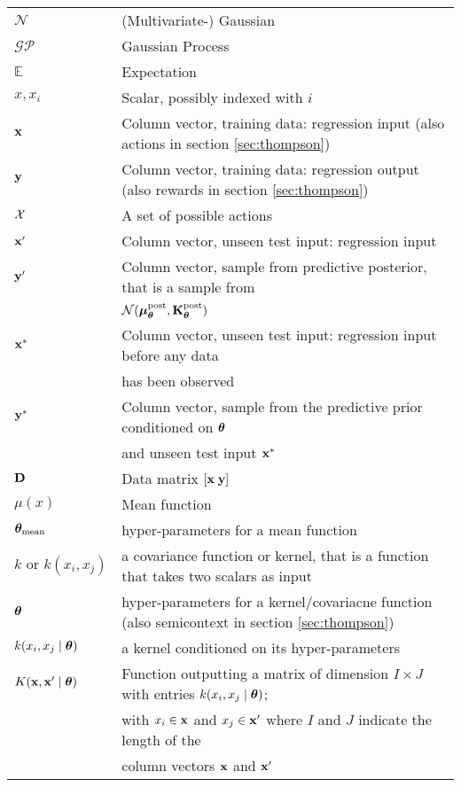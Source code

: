 \begin{tabular}{l l}
$\mathcal{N}$		&  (Multivariate-) Gaussian \\
$\mathcal{GP}$		&  Gaussian Process \\
$\mathbb{E}$		&  Expectation    \\
$x,x_i$ 			&  Scalar, possibly indexed with $i$   \\
$\mathbf{x}$				&  Column vector, training data:
regression input (also actions in section \ref{sec:thompson})    \\
$\mathbf{y}$				&  Column vector, training data:
regression output  (also rewards in section \ref{sec:thompson})    \\
$\mathcal{X}$				& A set of possible actions \\

 $\mathbf{x}^\prime$			&  Column vector, unseen test input: regression input    \\
 $\mathbf{y}^\prime$			&  Column vector, sample from predictive posterior, that
is a sample from\\
&$\mathcal{N}(\bm{\mu}_{\bm{\theta}}^\text{post},\mathbf{K}_{\bm{\theta}}^\text{post})$    \\

$\mathbf{x}^*$         &  Column vector, unseen test
input: regression input before any data\\
&has been observed    \\
$\mathbf{y}^*$		&  Column vector, sample from the predictive prior
conditioned on $\bm{\theta}$\\
& and unseen test input $\mathbf{x}^*$ \\
$\mathbf{D}$		&  Data matrix $[\mathbf{x}\; \mathbf{y}]$ \\

$\mu(x)$                 &  Mean function \\
$\bm{\theta}_{\text{mean}}$	&  hyper-parameters for a mean function
\\
$k \text{ or } k(x_i,x_j)$	&  a covariance function or kernel, that is a
function that takes two scalars as input \\

$\bm{\theta}$			&  hyper-parameters for a
kernel/covariacne function (also semicontext in section \ref{sec:thompson})\\
$k(x_i,x_j \mid \bm{\theta} )$		&  a kernel conditioned on its
hyper-parameters \\
$K(\mathbf{x},\mathbf{x}^\prime \mid \bm{\theta} )$    &  Function outputting a matrix of dimension $I \times J$
with entries $k(x_i,x_j \mid \bm{\theta} )$;\\
&with $x_i \in \mathbf{x}$ and $x_j \in \mathbf{x}^\prime$ where $I$ and $J$ indicate the length
of the\\
&column vectors $\mathbf{x}$ and
$\mathbf{x}^\prime$ \\


\end{tabular}
